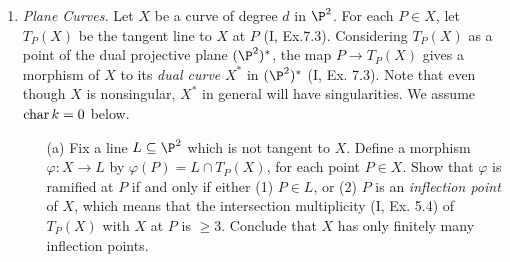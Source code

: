 \documentclass[a4paper]{article}
\begin{document}
\begin{enumerate} [label=\textbf{\arabic*.}, leftmargin=0em]
\begin{proof}
\begin{enumerate} [leftmargin=0cm]
            \item Let $B = k[x, z]/(z^2 - g(x))$ be an affine coordinate ring of $X$ with $g(x) = (x - \alpha_1) \cdots (x - \alpha_6)$, and let $f$ be the projection morphism onto the $x$-axis.
                  By (II, 8.3A), we have
                  \begin{equation*}
                    \Omega_{B / k} \cong (B \dd x \oplus B \dd z) / (g'(x) \dd x + 2z \dd z).
                  \end{equation*}
                  Let $P = (x', z')$ be a closed point in $X$.
                  If $z' \neq 0$, then $z$ is invertible in $\fO_{P, X}$, so that
                  \begin{equation*}
                    \dd z = - \frac{g'(x)}{2z} \dd x,
                  \end{equation*}
                  which means $\dd x$ generates $(\Omega_{B / k})_P$.
                  If $z' = 0$, then $x' = \alpha_i$ for some $i$, and $g'(x)$ is invertible in $\fO_{P, X}$, so that
                  \begin{equation*}
                    \dd x = - \frac{2z}{g'(x)} \dd z,
                  \end{equation*}
                  which means $\dd z$ generates $(\Omega_{B / k})_P$.
                  Since $\dd x $ is a local parameter of $\P^1$, we see that $P$ is ramified if and only if $z' = 0$ with ramification index $e_P = v_P( \dd x / \dd z) + 1 = 2$.
                  There are six ramification points corresponding to the six roots of $g(x)$.
                  Hence, $g(X) = 2$ by the Hurwitz formula.
          \end{enumerate}
        \end{proof}

  \item \textit{Plane Curves.} Let $X$ be a curve of degree $d$ in $\P^2$.
        For each $P \in X$, let $T_P(X)$ be the tangent line to $X$ at $P$ (I, Ex.7.3).
        Considering $T_P(X)$ as a point of the dual projective plane $(\P^2)^*$, the map $P \to T_P(X)$ gives a morphism of $X$ to its \textit{dual curve} $X^*$ in $(\P^2)^*$ (I, Ex. 7.3).
        Note that even though $X$ is nonsingular, $X^*$ in general will have singularities.
        We assume $\operatorname{char}{k} = 0$ below.

        \begin{itemize}
          \item[(a)] Fix a line $L \subseteq \P^2$ which is not tangent to $X$.
                Define a morphism $\varphi : X \to L$ by $\varphi(P) = L \cap T_P(X)$, for each point $P \in X$.
                Show that $\varphi$ is ramified at $P$ if and only if either (1) $P \in L$, or (2) $P$ is an \textit{inflection point} of $X$, which means that the intersection multiplicity (I, Ex. 5.4) of $T_P(X)$ with $X$ at $P$ is $\geq 3$.
                Conclude that $X$ has only finitely many inflection points.


\end{itemize}
\end{enumerate}
\end{document}
